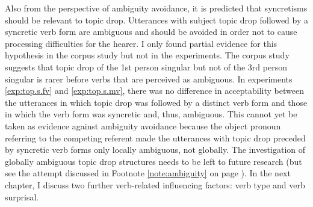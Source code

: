 Also from the perspective of ambiguity avoidance, it is predicted that syncretisms  should be relevant to topic drop.
Utterances with subject topic drop followed by a syncretic verb form are ambiguous and should be avoided in order not to cause processing difficulties for the hearer. 
I only found partial evidence for this hypothesis in the corpus study but not in the experiments.
The corpus  study suggests that topic drop of the 1st person singular but not of the 3rd person singular is rarer before verbs that are perceived as ambiguous.
In experiments \ref*{exp:top.s.fv} and \ref*{exp:top.s.mv}, there was no difference in acceptability between the utterances in which topic drop was followed by a distinct verb form and those in which the verb form was syncretic  and, thus, ambiguous. 
This cannot yet be taken as evidence against ambiguity avoidance because the object pronoun referring to the competing referent made the utterances with topic drop preceded by syncretic  verb forms only locally ambiguous, not globally.
The investigation of globally ambiguous topic drop structures needs to be left to future research (but see the attempt discussed in Footnote \ref{note:ambiguity} on page \pageref{note:ambiguity}).
In the next chapter, I discuss two further verb-related influencing factors: verb type and verb surprisal.
